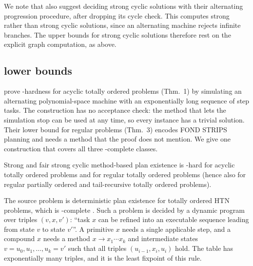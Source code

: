 We note that \CBb{} also suggest deciding strong cyclic solutions with their alternating
progression procedure, after dropping its cycle check. This computes strong rather than strong
cyclic solutions, since an alternating machine rejects infinite branches. The upper bounds for
strong cyclic solutions therefore rest on the explicit graph computation, as above.

\subsection{\EXPTIME{} lower bounds}\label{sec:exptime-hard}

\CBb{} prove \EXPTIME-hardness for acyclic totally ordered problems (Thm.~1) by simulating an
alternating polynomial-space machine with an exponentially long sequence of step tasks. The
construction has no acceptance check: the method that lets the simulation stop can be used at any
time, so every instance has a trivial solution. Their lower bound for regular problems (Thm.~3)
encodes FOND STRIPS planning and needs a method that the proof does not mention. We give one
construction that covers all three \EXPTIME-complete classes.

\begin{theorem}\label{thm:exptime-hard}
  Strong and fair strong cyclic method-based plan existence is \EXPTIME-hard for acyclic totally
  ordered problems and for regular totally ordered problems (hence also for regular partially
  ordered and tail-recursive totally ordered problems).
\end{theorem}

The source problem is deterministic plan existence for totally ordered HTN problems, which is
\EXPTIME-complete \parencite{alford:et:al:icaps-15}. Such a problem is decided by a dynamic
program over triples $(v,x,v')$: ``task $x$ can be refined into an executable sequence leading
from state $v$ to state $v'$''. A primitive $x$ needs a single applicable step, and a compound $x$
needs a method $x\to x_1\cdots x_k$ and intermediate states $v=u_0,u_1,\dots,u_k=v'$ such that all
triples $(u_{i-1},x_i,u_i)$ hold. The table has exponentially many triples, and it is the least
fixpoint of this rule.

